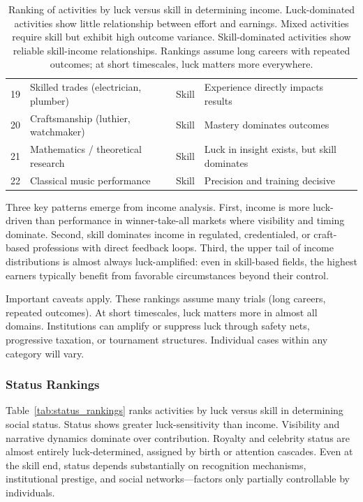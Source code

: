 \begin{table}[H]
\begin{tabular}{clll}
      19 & Skilled trades (electrician, plumber) & Skill & Experience directly impacts results \\
      20 & Craftsmanship (luthier, watchmaker) & Skill & Mastery dominates outcomes \\
      21 & Mathematics / theoretical research & Skill & Luck in insight exists, but skill dominates \\
      22 & Classical music performance & Skill & Precision and training decisive \\
      \bottomrule
    \end{tabular}
    \caption{Ranking of activities by luck versus skill in determining income. Luck-dominated activities show little relationship between effort and earnings. Mixed activities require skill but exhibit high outcome variance. Skill-dominated activities show reliable skill-income relationships. Rankings assume long careers with repeated outcomes; at short timescales, luck matters more everywhere.}
    \label{tab:income_rankings}
  \end{table}

  Three key patterns emerge from income analysis. First, income is more
  luck-driven than performance in winner-take-all markets where visibility
  and timing dominate. Second, skill dominates income in regulated, credentialed,
  or craft-based professions with direct feedback loops. Third, the
  upper tail of income distributions is almost always luck-amplified:
  even in skill-based fields, the highest earners typically benefit from
  favorable circumstances beyond their control.

  Important caveats apply. These rankings assume many trials (long careers,
  repeated outcomes). At short timescales, luck matters more in almost
  all domains. Institutions can amplify or suppress luck through safety
  nets, progressive taxation, or tournament structures. Individual cases
  within any category will vary.

  \subsubsection{Status Rankings}

  Table~\ref{tab:status_rankings} ranks activities by luck versus skill
  in determining social status. Status shows greater luck-sensitivity
  than income. Visibility and narrative dynamics dominate over contribution.
  Royalty and celebrity status are almost entirely luck-determined, assigned
  by birth or attention cascades. Even at the skill end, status depends
  substantially on recognition mechanisms, institutional prestige, and
  social networks—factors only partially controllable by individuals.

